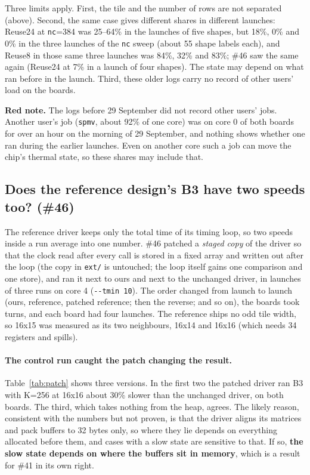 \documentclass[11pt,a4paper]{article}
\newcommand{\rednote}[1]{\par\smallskip\noindent\textcolor{red!80!black}{\textbf{Red note.} #1}\par\smallskip}
\begin{document}
Three limits apply. First, the tile and the number of rows are not separated (above). Second, the same case gives different
shares in different launches: Reuse24 at \texttt{nc}=384 was 25--64\% in the launches of five shapes, but 18\%, 0\% and 0\% in the
three launches of the \texttt{nc} sweep (about 55 shape labels each), and Reuse8 in those same three launches was 84\%, 32\% and
83\%; \#46 saw the same again (Reuse24 at 7\% in a launch of four shapes). The state may depend on what ran before in the
launch. Third, these older logs carry no record of other users' load on the boards.
\rednote{The logs before 29 September did not record other users' jobs. Another user's job (\texttt{spmv}, about 92\% of one core)
was on core 0 of both boards for over an hour on the morning of 29 September, and nothing shows whether one ran during the
earlier launches. Even on another core such a job can move the chip's thermal state, so these shares may include that.}

\subsection{Does the reference design's B3 have two speeds too? (\#46)}
\label{sec:ref46}
The reference driver keeps only the total time of its timing loop, so two speeds inside a run average into one number.
\#46 patched a \emph{staged copy} of the driver so that the clock read after every call is stored in a fixed array and written out
after the loop (the copy in \texttt{ext/} is untouched; the loop itself gains one comparison and one store), and ran it
next to ours and next to the unchanged driver, in launches of three runs on core 4 (\texttt{-{}-tmin 10}). The order changed from launch to launch (ours,
reference, patched reference; then the reverse; and so on), the boards took turns, and each board had four launches. The reference ships no
odd tile width, so 16x15 was measured as its two neighbours, 16x14 and 16x16 (which needs 34 registers and spills).

\paragraph{The control run caught the patch changing the result.} Table~\ref{tab:patch} shows three versions. In the first two the
patched driver ran B3 with K=256 at 16x16 about 30\% slower than the unchanged driver, on both boards. The third, which takes nothing from
the heap, agrees. The likely reason, consistent with the numbers but not proven, is that the driver aligns its matrices and pack buffers to
32 bytes only, so where they lie depends on everything allocated before them, and cases with a slow state are sensitive to that.
If so, \textbf{the slow state depends on where the buffers sit in memory}, which is a result for \#41 in its own right.
\end{document}
